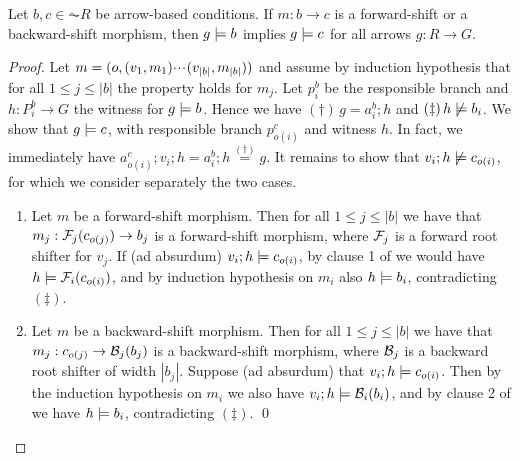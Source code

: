 \begin{proposition}
Let $b,c \in \AC{R}$  be arrow-based conditions. If $m:b\to c$ is a forward-shift or a backward-shift morphism, then $g\models b$ implies $g \models c$ for all arrows $g:R\to G$. 
\end{proposition}
%
\begin{fullorname}
\begin{proof}
Let $m = (o,(v_1,m_1){\cdotp\mkern-2mu\cdotp\mkern-2mu\cdotp\mkern1mu} (v_{|b|},m_{|b|}))$ and assume by induction hypothesis that for all $1\leq j\leq |b|$ the property holds for $m_j$. Let $p^b_i$ be the responsible branch and $h: P^b_i \to G$ the witness for $g\models b$. 
Hence we have $(\dagger)\, g=a^b_i;h$ and $(\ddagger)\, h \not\models b_i$.  
We show that $g \models c$, with responsible branch $p^c_{o(i)}$ and witness $h$. In fact, we immediately have  $a^c_{o(i)}; v_i ;h = a^b_i ; h \stackrel{(\dagger)}{=} g$. It remains to show that $v_i ;h \not\models c_{o(i)}$, for which we consider separately the two cases.
\begin{enumerate}
\item Let $m$ be a forward-shift morphism. Then for all $1\leq j\leq |b|$ we have that   $m_j:\mathcal{F}_j(c_{o(j)}) \rightarrow b_j$ is a forward-shift morphism, where $\mathcal{F}_j$ is a forward root shifter for $v_j$. If (ad absurdum) $v_i ;h \models c_{o(i)}$, by clause 1 of  we would have $h \models \mathcal{F}_i(c_{o(i)})$, and by induction hypothesis on $m_i$ also $h \models b_i$, contradicting $(\ddagger)$.

\item Let $m$ be a backward-shift morphism. Then for all $1\leq j\leq |b|$ we have that  $m_j:c_{o(j)}\rightarrow \mathcal{B}_j(b_j)$ is a backward-shift morphism, where $\mathcal{B}_j$ is a backward root shifter of width $|b_j|$.
Suppose (ad absurdum) that $v_i ;h \models c_{o(i)}$. Then by the induction hypothesis on $m_i$ we also have $v_i ;h \models \mathcal{B}_i(b_i)$, and by clause 2 of  we  have $h \models b_i$, contradicting $(\ddagger)$.
\qed
\end{enumerate}
\end{proof}
\end{fullorname}

